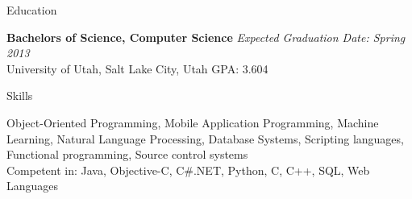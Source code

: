 \documentclass{resume}
\begin{document}
\begin{rSection}{Education}

{\bf Bachelors of Science, Computer Science} \hfill {\em Expected Graduation Date: Spring 2013} \\ 
University of Utah, Salt Lake City, Utah \hfill  GPA: 3.604

\end{rSection}


\begin{rSection}{Skills}

Object-Oriented Programming, Mobile Application Programming, Machine Learning, Natural Language Processing, Database Systems, Scripting languages, Functional programming, Source control systems \\
Competent in: Java, Objective-C, C\#.NET, Python, C, C++, SQL, Web Languages

\end{rSection}

\end{document}

